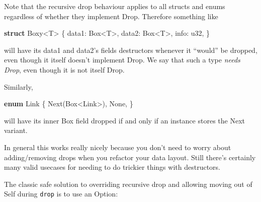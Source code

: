 \documentclass[a4paper,]{book}
\newenvironment{Shaded}{\begin{snugshade}}{\end{snugshade}}
\newcommand{\KeywordTok}[1]{\textcolor[rgb]{0.13,0.29,0.53}{\textbf{{#1}}}}
\newcommand{\DataTypeTok}[1]{\textcolor[rgb]{0.13,0.29,0.53}{{#1}}}
\newcommand{\ConstantTok}[1]{\textcolor[rgb]{0.00,0.00,0.00}{{#1}}}
\newcommand{\NormalTok}[1]{{#1}}
\begin{document}
Note that the recursive drop behaviour applies to all structs and enums
regardless of whether they implement Drop. Therefore something like

\begin{Shaded}
\begin{Highlighting}[]
\KeywordTok{struct} \NormalTok{Boxy<T> \{}
    \NormalTok{data1: }\DataTypeTok{Box}\NormalTok{<T>,}
    \NormalTok{data2: }\DataTypeTok{Box}\NormalTok{<T>,}
    \NormalTok{info: }\DataTypeTok{u32}\NormalTok{,}
\NormalTok{\}}
\end{Highlighting}
\end{Shaded}

will have its data1 and data2's fields destructors whenever it ``would''
be dropped, even though it itself doesn't implement Drop. We say that
such a type \emph{needs Drop}, even though it is not itself Drop.

Similarly,

\begin{Shaded}
\begin{Highlighting}[]
\KeywordTok{enum} \NormalTok{Link \{}
    \NormalTok{Next(}\DataTypeTok{Box}\NormalTok{<Link>),}
    \ConstantTok{None}\NormalTok{,}
\NormalTok{\}}
\end{Highlighting}
\end{Shaded}

will have its inner Box field dropped if and only if an instance stores
the Next variant.

In general this works really nicely because you don't need to worry
about adding/removing drops when you refactor your data layout. Still
there's certainly many valid usecases for needing to do trickier things
with destructors.

The classic safe solution to overriding recursive drop and allowing
moving out of Self during \texttt{drop} is to use an Option:
\end{document}
